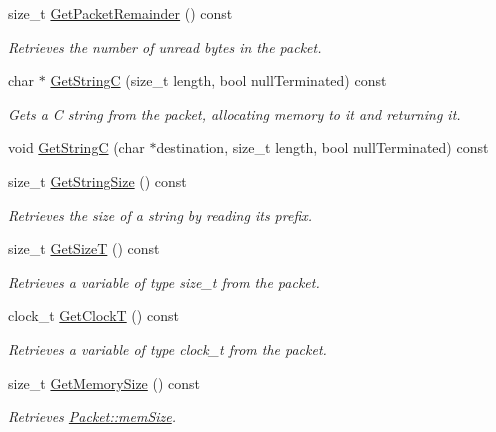 \begin{DoxyCompactItemize}
size\_\-t \hyperlink{class_packet_a5e811abd88202438a9b1b887a0baf65b}{GetPacketRemainder} () const 
\begin{DoxyCompactList}\small\item\em Retrieves the number of unread bytes in the packet. \item\end{DoxyCompactList}\item 
char $\ast$ \hyperlink{class_packet_adda05c109561de815c266d444c6285f0}{GetStringC} (size\_\-t length, bool nullTerminated) const 
\begin{DoxyCompactList}\small\item\em Gets a C string from the packet, allocating memory to it and returning it. \item\end{DoxyCompactList}\item 
void \hyperlink{class_packet_a322f2409cab20ad6748753c565997aaa}{GetStringC} (char $\ast$destination, size\_\-t length, bool nullTerminated) const 
\item 
size\_\-t \hyperlink{class_packet_a53925d61303db6897c72afc29b2ef2a2}{GetStringSize} () const 
\begin{DoxyCompactList}\small\item\em Retrieves the size of a string by reading its prefix. \item\end{DoxyCompactList}\item 
size\_\-t \hyperlink{class_packet_a27a001a30a7a5c09869f1e1f567e09fa}{GetSizeT} () const 
\begin{DoxyCompactList}\small\item\em Retrieves a variable of type size\_\-t from the packet. \item\end{DoxyCompactList}\item 
clock\_\-t \hyperlink{class_packet_a357ea92c52237847d12fa80f433fb839}{GetClockT} () const 
\begin{DoxyCompactList}\small\item\em Retrieves a variable of type clock\_\-t from the packet. \item\end{DoxyCompactList}\item 
size\_\-t \hyperlink{class_packet_a2488b5121b48f108f5acf5f85c234d8a}{GetMemorySize} () const 
\begin{DoxyCompactList}\small\item\em Retrieves \hyperlink{class_packet_a1c2e5054d27221467e8db5dc9e71c04a}{Packet::memSize}. \item\end{DoxyCompactList}\item 

\end{DoxyCompactItemize}

